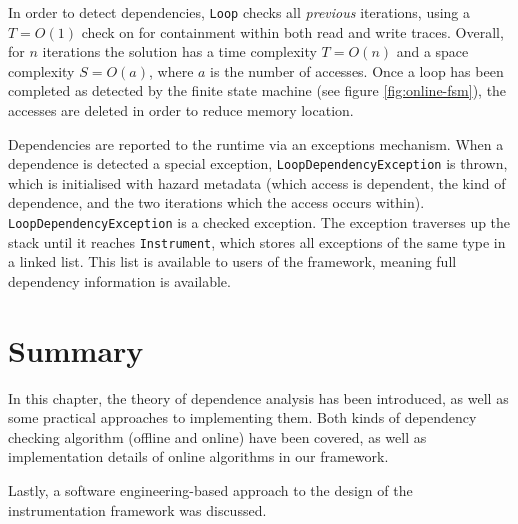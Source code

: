 		In order to detect dependencies, \texttt{Loop} checks all \emph{previous} iterations, using a $T=O(1)$ check on for containment within both read and write traces. Overall, for $n$ iterations the solution has a time complexity $T=O(n)$ and a space complexity $S=O(a)$, where $a$ is the number of accesses. Once a loop has been completed as detected by the finite state machine (see figure \ref{fig:online-fsm}), the accesses are deleted in order to reduce memory location.
		
		Dependencies are reported to the runtime via an exceptions mechanism. When a dependence is detected a special exception, \texttt{LoopDependencyException} is thrown, which is initialised with hazard metadata (which access is dependent, the kind of dependence, and the two iterations which the access occurs within). \texttt{LoopDependencyException} is a checked exception. The exception traverses up the stack until it reaches \texttt{Instrument}, which stores all exceptions of the same type in a linked list. This list is available to users of the framework, meaning full dependency information is available.

\section{Summary} \label{sec:runtime/summary}
In this chapter, the theory of dependence analysis has been introduced, as well as some practical approaches to implementing them. Both kinds of dependency checking algorithm (offline and online) have been covered, as well as implementation details of online algorithms in our framework.

Lastly, a software engineering-based approach to the design of the instrumentation framework was discussed.